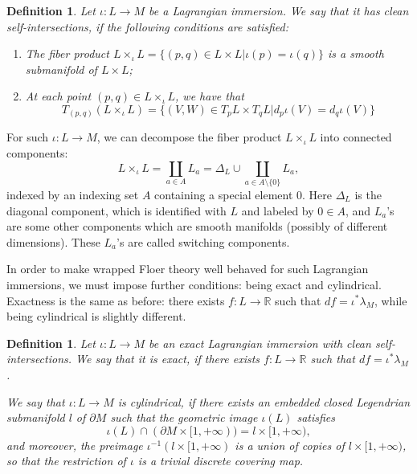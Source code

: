 \documentclass{amsart}
\newtheorem{definition}[theorem]{Definition}
\numberwithin{equation}{section}
\numberwithin{figure}{section}
\begin{document}
\begin{definition}
	Let $\iota: L \to M$ be a Lagrangian immersion. We say that it has clean self-intersections, if the following conditions are satisfied:
\begin{enumerate} [label=(\roman*)]

\item The fiber product $L \times_{\iota} L = \{(p, q) \in L \times L| \iota(p) = \iota(q)\}$ is a smooth submanifold of $L \times L$;

\item At each point $(p, q) \in L \times_{\iota} L$, we have that
\begin{equation}
T_{(p, q)}(L \times_{\iota} L) = \{(V, W) \in T_{p}L \times T_{q}L| d_{p}\iota(V) = d_{q}\iota(V)\}
\end{equation}

\end{enumerate}
\end{definition}

	For such $\iota: L \to M$, we can decompose the fiber product $L \times_{\iota} L$ into connected components:
\begin{equation}
L \times_{\iota} L = \coprod_{a \in A} L_{a} = \Delta_{L} \cup \coprod_{a \in A \setminus \{0\}} L_{a},
\end{equation}
indexed by an indexing set $A$ containing a special element $0$. Here $\Delta_{L}$ is the diagonal component, which is identified with $L$ and labeled by $0 \in A$, and $L_{a}$'s are some other components which are smooth manifolds (possibly of different dimensions). These $L_{a}$'s are called switching components. \par
	In order to make wrapped Floer theory well behaved for such Lagrangian immersions, we must impose further conditions: being exact and cylindrical. Exactness is the same as before: there exists $f: L \to \mathbb{R}$ such that $df = \iota^{*}\lambda_{M}$, while being cylindrical is slightly different. \par

\begin{definition}
	Let $\iota: L \to M$ be an exact Lagrangian immersion with clean self-intersections. We say that it is exact, if there exists $f: L \to \mathbb{R}$ such that $df = \iota^{*}\lambda_{M}$. \par
	We say that $\iota: L \to M$ is cylindrical, if there exists an embedded closed Legendrian submanifold $l$ of $\partial M$ such that the geometric image $\iota(L)$ satisfies
\begin{equation}
\iota(L) \cap (\partial M \times [1, +\infty)) = l \times [1, +\infty),
\end{equation}
and moreover, the preimage $\iota^{-1}(l \times [1, +\infty)$ is a union of copies of $l \times [1, +\infty)$, so that the restriction of $\iota$ is a trivial discrete covering map.
\end{definition}
\end{document}

